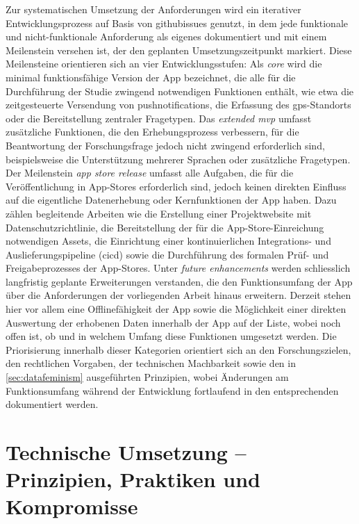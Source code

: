 Zur systematischen Umsetzung der Anforderungen wird ein iterativer Entwicklungsprozess auf Basis von \glspl{githubissue} genutzt, in dem jede funktionale und nicht-funktionale Anforderung als eigenes  dokumentiert und mit einem Meilenstein versehen ist, der den geplanten Umsetzungszeitpunkt markiert. Diese Meilensteine orientieren sich an vier Entwicklungsstufen: Als \textit{core } wird die minimal funktionsfähige Version der App bezeichnet, die alle für die Durchführung der Studie zwingend notwendigen Funktionen enthält, wie etwa die zeitgesteuerte Versendung von \glspl{pushnotification}, die Erfassung des \gls{gps}-Standorts oder die Bereitstellung zentraler Fragetypen. Das \textit{extended \gls{mvp}} umfasst zusätzliche Funktionen, die den Erhebungsprozess verbessern, für die Beantwortung der Forschungsfrage jedoch nicht zwingend erforderlich sind, beispielsweise die Unterstützung mehrerer Sprachen oder zusätzliche Fragetypen. Der Meilenstein \textit{app store release} umfasst alle Aufgaben, die für die Veröffentlichung in App-Stores erforderlich sind, jedoch keinen direkten Einfluss auf die eigentliche Datenerhebung oder Kernfunktionen der App haben. Dazu zählen begleitende Arbeiten wie die Erstellung einer Projektwebsite mit Datenschutzrichtlinie, die Bereitstellung der für die App-Store-Einreichung notwendigen Assets, die Einrichtung einer kontinuierlichen Integrations- und Auslieferungspipeline (\gls{cicd}) sowie die Durchführung des formalen Prüf- und Freigabeprozesses der App-Stores. Unter \textit{future enhancements} werden schliesslich langfristig geplante Erweiterungen verstanden, die den Funktionsumfang der App über die Anforderungen der vorliegenden Arbeit hinaus erweitern. Derzeit stehen hier vor allem eine Offlinefähigkeit der App sowie die Möglichkeit einer direkten Auswertung der erhobenen Daten innerhalb der App auf der Liste, wobei noch offen ist, ob und in welchem Umfang diese Funktionen umgesetzt werden. Die Priorisierung innerhalb dieser Kategorien orientiert sich an den Forschungszielen, den rechtlichen Vorgaben, der technischen Machbarkeit sowie den in \cref{sec:datafeminism} ausgeführten Prinzipien, wobei Änderungen am Funktionsumfang während der Entwicklung fortlaufend in den entsprechenden  dokumentiert werden.


\section{Technische Umsetzung -- Prinzipien, Praktiken und Kompromisse}
\label{sec:app_entwicklung_technische_umsetzung}

